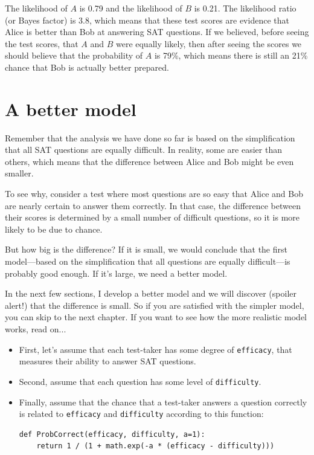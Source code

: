 \documentclass[12pt]{book}
\begin{document}
The likelihood of $A$ is 0.79 and the likelihood of $B$ is 0.21.  The
likelihood ratio (or Bayes factor) is 3.8, which means that these test
scores are evidence that Alice is better than Bob at answering SAT
questions.  If we believed, before seeing the test scores, that $A$
and $B$ were equally likely, then after seeing the scores we should
believe that the probability of $A$ is 79\%, which means there is
still an 21\% chance that Bob is actually better prepared.


\section{A better model}

Remember that the analysis we have done so far is based on
the simplification that all SAT questions are equally difficult.
In reality, some are easier than others, which means that the
difference between Alice and Bob might be even smaller.

To see why, consider a test where most questions are so easy that
Alice and Bob are nearly certain to answer them correctly.  In that
case, the difference between their scores is determined by a small
number of difficult questions, so it is more likely to be due to
chance.

But how big is the difference?  If it is small, we would conclude
that the first model---based on the simplification that all questions
are equally difficult---is probably good enough.  If it's large,
we need a better model.

In the next few sections, I develop a better model and we will
discover (spoiler alert!) that the difference is small.  So if
you are satisfied with the simpler model, you can skip to the next
chapter.  If you want to see how the more realistic model works,
read on...

\begin{itemize}

\item First, let's assume that each test-taker has some 
  degree of {\tt efficacy}, that measures their
  ability to answer SAT questions.

\item Second, assume that each question has some level of
  {\tt difficulty}.

\item Finally, assume that the chance that a test-taker answers a
  question correctly is related to {\tt efficacy} and {\tt difficulty}
  according to this function:

\begin{verbatim}
def ProbCorrect(efficacy, difficulty, a=1):
    return 1 / (1 + math.exp(-a * (efficacy - difficulty)))
\end{verbatim}

\end{itemize}
\end{document}
